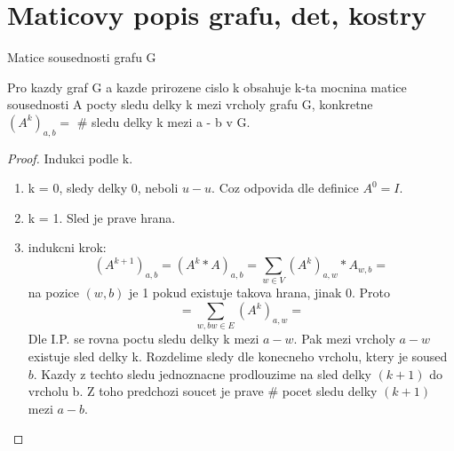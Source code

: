\section{\texorpdfstring{Maticovy popis grafu, det, kostry}{Maticovy popis grafu, det, kostry}}
\vspace{5mm}
\large

\begin{definition}
Matice sousednosti grafu G
\end{definition}

\begin{theorem}
Pro kazdy graf G a kazde prirozene cislo k obsahuje k-ta mocnina matice sousednosti A pocty sledu delky k mezi vrcholy grafu G, konkretne\\
$(A^k)_{a,b} = $ \# sledu delky k mezi a - b v G.

\end{theorem}
\begin{proof}
Indukci podle k.
\begin{enumerate}
	\item k = 0, sledy delky 0, neboli $ u - u $. Coz odpovida dle definice $ A^0 = I $.
	\item k = 1. Sled je prave hrana.
	\item indukcni krok:
	\[(A^{k+1})_{a,b} = (A^k * A)_{a,b} = \sum_{w \in V} (A^k)_{a,w} * A_{w,b} = \]
	na pozice $ (w,b) $ je 1 pokud existuje takova hrana, jinak 0. Proto
	\[ = \sum_{w, bw \in E} (A^k)_{a,w} = \]
	Dle I.P. se rovna poctu sledu delky k mezi $a - w$.
	Pak mezi vrcholy $ a - w $ existuje sled delky k. Rozdelime sledy dle konecneho vrcholu, ktery je soused $b$. Kazdy z techto sledu jednoznacne prodlouzime na sled delky $(k+1)$ do vrcholu b. Z toho predchozi soucet je prave \# pocet sledu delky $(k+1)$ mezi $ a - b $.
\end{enumerate}
\end{proof}

